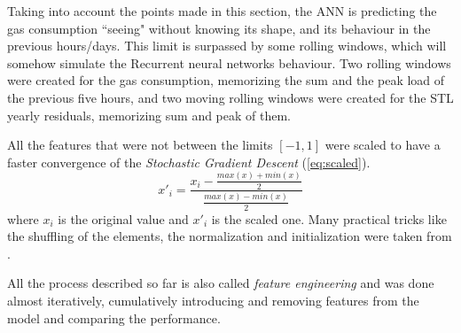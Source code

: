 \documentclass{sig-alternate-sigmod07}
\begin{document}
Taking into account the points made in this section, the ANN is predicting the gas consumption ``seeing" without knowing its shape, and its behaviour in the previous hours/days. This limit is surpassed by some rolling windows, which will somehow simulate the Recurrent neural networks behaviour. Two rolling windows were created for the gas consumption, memorizing the sum and the peak load of the previous five hours, and two moving rolling windows were created for the STL yearly residuals, memorizing sum and peak of them.

All the features that were not between the limits $[-1,1]$ were scaled to have a faster convergence \cite{lecun2012efficient} of the \emph{Stochastic Gradient Descent} (\cref{eq:scaled}).
\begin{equation}\label{eq:scaled}
x'_i=\frac{x_i -  \frac{max(x) + min(x)}{2}}{ \frac{max(x) - min(x)}{2}}\end{equation} where $x_i$ is the original value and $x'_i$ is the scaled one. Many practical tricks like the shuffling of the elements, the normalization and initialization were taken from \cite{lecun2012efficient, bottou2012stochastic}.

All the process described so far is also called \emph{feature engineering} and was done almost iteratively, cumulatively introducing and removing features from the model and comparing the performance.
\end{document}
